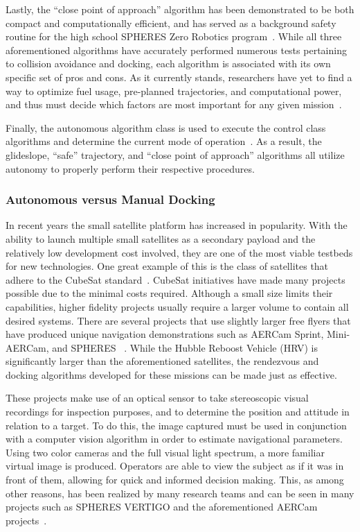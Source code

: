 \documentclass[paper=letter, fontsize=11pt]{scrartcl} %
\numberwithin{equation}{section} %
\numberwithin{figure}{section} %
\numberwithin{table}{section} %
\begin{document}
Lastly, the ``close point of approach'' algorithm has been demonstrated to be both compact and computationally efficient, and has served as a background safety routine for the high school SPHERES Zero Robotics program~\cite{virt_sim}. While all three aforementioned algorithms have accurately performed numerous tests pertaining to collision avoidance and docking, each algorithm is associated with its own specific set of pros and cons. As it currently stands, researchers have yet to find a way to optimize fuel usage, pre-planned trajectories, and computational power, and thus must decide which factors are most important for any given mission~\cite{SPHERES_form,SPHERES_micro,dist,virt_sim}.

Finally, the autonomous algorithm class is used to execute the control class algorithms and determine the current mode of operation~\cite{SPHERES_form}. As a result, the glideslope, ``safe'' trajectory, and ``close point of approach'' algorithms all utilize autonomy to properly perform their respective procedures.

\subsubsection{Autonomous versus Manual Docking}
In recent years the small satellite platform has increased in popularity. With the ability to launch multiple small satellites as a secondary payload and the relatively low development cost involved, they are one of the most viable testbeds for new technologies. One great example of this is the class of satellites that adhere to the CubeSat standard~\cite{CubeSat}. CubeSat initiatives have made many projects possible due to the minimal costs required. Although a small size limits their capabilities, higher fidelity projects usually require a larger volume to contain all desired systems. There are several projects that use slightly larger free flyers that have produced unique navigation demonstrations such as AERCam Sprint, Mini-AERCam, and SPHERES ~\cite{Aercam,MiniAercam,SPHERES}. While the Hubble Reboost Vehicle (HRV) is significantly larger than the aforementioned satellites, the rendezvous and docking algorithms developed for these missions can be made just as effective.

These projects make use of an optical sensor to take stereoscopic visual recordings for inspection purposes, and to determine the position and attitude in relation to a target. To do this, the image captured must be used in conjunction with a computer vision algorithm in order to estimate navigational parameters. Using two color cameras and the full visual light spectrum, a more familiar virtual image is produced. Operators are able to view the subject as if it was in front of them, allowing for quick and informed decision making. This, as among other reasons, has been realized by many research teams and can be seen in many projects such as SPHERES VERTIGO and the aforementioned AERCam projects~\cite{Aercam,MiniAercam,Vertigo1}.
\end{document}
